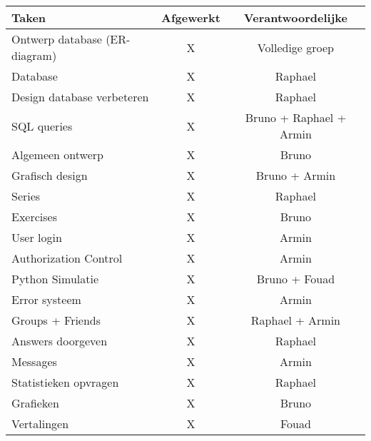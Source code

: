 \begin{tabular}{| l | c | c |}
    \hline
    Taken   &   Afgewerkt   &   Verantwoordelijke \\
    \hline \hline
    Ontwerp database (ER-diagram)   &   X   &   Volledige groep \\
    Database                &   X   &   Raphael \\
    Design database verbeteren  &   X   &   Raphael \\
    SQL queries             &   X   &   Bruno + Raphael + Armin \\
    Algemeen ontwerp        &   X   &   Bruno   \\
    Grafisch design         &   X   &   Bruno + Armin  \\
    Series                  &   X   &   Raphael \\
    Exercises              &   X   &   Bruno   \\
    User login              &   X   &   Armin   \\
    Authorization Control   &   X   &   Armin   \\
    Python Simulatie        &   X   &   Bruno + Fouad   \\
    Error systeem           &   X   &   Armin \\
    Groups + Friends        &   X   &   Raphael + Armin    \\
    Answers doorgeven       &   X   &   Raphael \\
    Messages                &   X   &   Armin   \\
    Statistieken opvragen   &   X   &   Raphael \\
    Grafieken               &   X   &   Bruno   \\
    Vertalingen             &   X   &   Fouad   \\
    \hline
\end{tabular}
